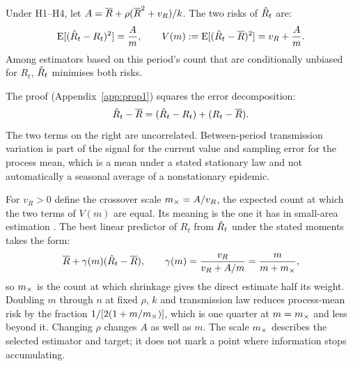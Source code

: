 \begin{proposition}
\label{prop:average}
Under H1--H4, let $A=\overline{R}+\rho(\overline{R}^2+v_R)/k$. The two risks of $\hat R_t$ are:
\begin{equation}
  \operatorname{E}[(\hat R_t-R_t)^2]=\frac{A}{m},\qquad
  V(m):=\operatorname{E}[(\hat R_t-\overline{R})^2]=v_R+\frac{A}{m}.
  \label{eq:var-average}
\end{equation}
Among estimators based on this period's count that are conditionally unbiased for $R_t$, $\hat R_t$ minimises both risks.
\end{proposition}

The proof (Appendix~\ref{app:prop1}) squares the error decomposition:
\begin{equation}
  \hat R_t-\overline{R}=(\hat R_t-R_t)+(R_t-\overline{R}).
  \label{eq:error-split}
\end{equation}
The two terms on the right are uncorrelated. Between-period transmission variation is part of the signal for the current value and sampling error for the process mean, which is a mean under a stated stationary law and not automatically a seasonal average of a nonstationary epidemic.

For $v_R>0$ define the crossover scale $m_\times=A/v_R$, the expected count at which the two terms of $V(m)$ are equal. Its meaning is the one it has in small-area estimation \citep{fay1979estimates}. The best linear predictor of $R_t$ from $\hat R_t$ under the stated moments takes the form:
\begin{equation}
  \overline{R}+\gamma(m)(\hat R_t-\overline{R}),\qquad
  \gamma(m)=\frac{v_R}{v_R+A/m}=\frac{m}{m+m_\times},
  \label{eq:shrink-weight}
\end{equation}
so $m_\times$ is the count at which shrinkage gives the direct estimate half its weight. Doubling $m$ through $n$ at fixed $\rho$, $k$ and transmission law reduces process-mean risk by the fraction $1/[2(1+m/m_\times)]$, which is one quarter at $m=m_\times$ and less beyond it. Changing $\rho$ changes $A$ as well as $m$. The scale $m_\times$ describes the selected estimator and target; it does not mark a point where information stops accumulating.

